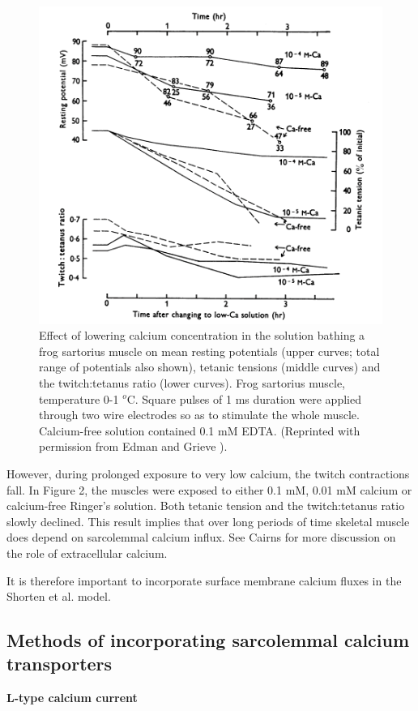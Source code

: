\documentclass[fleqn,10pt]{physiome}
\begin{document}
\begin{figure}[ht!]
\centering
\includegraphics[width=0.7\linewidth]{fig02}
\caption{Effect of lowering calcium concentration in the solution bathing a frog sartorius muscle on mean resting potentials (upper curves; total range of potentials also shown), tetanic tensions (middle curves) and the twitch:tetanus ratio (lower curves). Frog sartorius muscle, temperature 0-1 $^{o}$C. Square pulses of 1 ms duration were applied through two wire electrodes so as to stimulate the whole muscle. Calcium-free solution contained 0.1 mM EDTA. 
(Reprinted with permission from Edman and Grieve \citep{edman1964role}).
}
\label{fig02}
\end{figure}

However, during prolonged exposure to very low calcium, the twitch contractions fall. In Figure 2, the muscles were exposed to either 0.1 mM, 0.01 mM calcium or calcium-free Ringer’s solution. Both tetanic tension and the twitch:tetanus ratio slowly declined. This result implies that over long periods of time skeletal muscle does depend on sarcolemmal calcium influx. See Cairns \citep{cairns2003changes,cairns2008multiple} for more discussion on the role of extracellular calcium. 

It is therefore important to incorporate surface membrane calcium fluxes in the Shorten et al. model. 


\subsection{Methods of incorporating sarcolemmal calcium transporters}

\textbf{L-type calcium current}\newline
\end{document}
